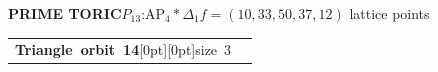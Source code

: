 \documentclass[14pt]{extarticle}
\makeatletter
\newcommand{\AtlasSupportOrbitSplit}[2]{%
  \begin{tabularx}{\linewidth}[t]{%
    @{}>{\raggedright\arraybackslash}p{.37\linewidth}%
    @{\hspace{2.5mm}\AtlasOrbitDivider\hspace{2.5mm}}%
    >{\raggedright\arraybackslash}X@{}}%
    \begin{minipage}[t]{\linewidth}\vspace{0pt}#1\end{minipage} &
    \begin{minipage}[t]{\linewidth}\vspace{0pt}#2\end{minipage}
  \end{tabularx}}
\makeatother
\begin{document}
\begin{atlasbox}\begin{atlaspanel}
\textcolor{toricgreen}{\bfseries PRIME TORIC}\quad \(P_{13}\):\enspace \(\mathrm{AP}_{4}\ast\Delta_{1}\)\quad \(f=(10,33,50,37,12)\) lattice points
\end{atlaspanel}\end{atlasbox}
\clearpage
\begin{atlaspanel}[top=1mm,bottom=2mm]
\AtlasSupportOrbitSplit{%
\vspace*{-3mm}\mbox{{\LARGE\bfseries Triangle orbit 14}\hspace{3mm}\raisebox{.8mm}[0pt][0pt]{{\fontsize{16}{18}\selectfont\color{muted}size 3}}}%
}{%
\vspace*{-3mm}{\fontsize{13}{16}\selectfont{\color{muted}\(\mathbb{Q}\) and \(\mathbb{F}_2\)}\quad{\color{muted}\(\underline{\{8,\,30,\,37\}}\), \(\{10,\,33,\,37\}\), \(\{9,\,34,\,37\}\)}\rule[-3mm]{0pt}{3mm}}%
}%
\end{atlaspanel}\vspace{2mm}
\end{document}
